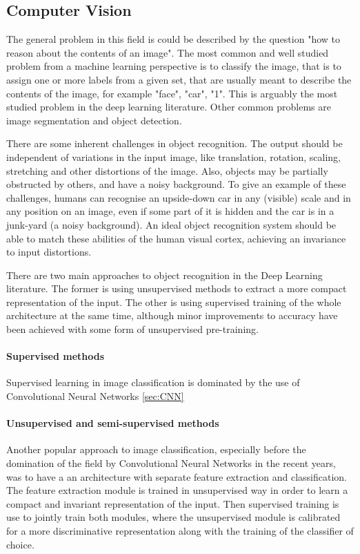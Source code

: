 \documentclass[a4paper]{article}
\begin{document}
	\subsection{Computer Vision}
	\label{sec:CV}
		The general problem in this field is could be described by the question "how to reason about the contents of an image". 
		The most common and well studied problem from a machine learning perspective is to classify the image, that is to assign one or more labels from a given set, that are usually meant to describe the contents of the image, for example "face", "car", "1". This is arguably the most studied problem in the deep learning literature.
		Other common problems are image segmentation and object detection.
		
		There are some inherent challenges in object recognition. The output should be independent of variations in the input image, like translation, rotation, scaling, stretching and other distortions of the image. Also, objects may be partially obstructed by others, and have a noisy background. To give an example of these challenges, humans can recognise an upside-down car in any (visible) scale and in any position on an image, even if some part of it is hidden and the car is in a junk-yard (a noisy background). An ideal object recognition system should be able to match these abilities of the human visual cortex, achieving an invariance to input distortions. 
		
		There are two main approaches to object recognition in the Deep Learning literature. The former is using unsupervised methods to extract a more compact representation of the input. The other is using supervised training of the whole architecture at the same time, although minor improvements to accuracy have been achieved with some form of unsupervised pre-training.
		\paragraph{Supervised methods}
			Supervised learning in image classification is dominated by the use of Convolutional Neural Networks \ref{sec:CNN}
		\paragraph{Unsupervised and semi-supervised methods}
			Another popular approach to image classification, especially before the domination of the field by Convolutional Neural Networks in the recent years, was to have a an architecture with separate feature extraction and classification. The feature extraction module is trained in unsupervised way in order to learn a compact and invariant representation of the input. Then supervised training is use to jointly train both modules, where the unsupervised module is calibrated for a more discriminative representation along with the training of the classifier of choice.
			
\end{document}
